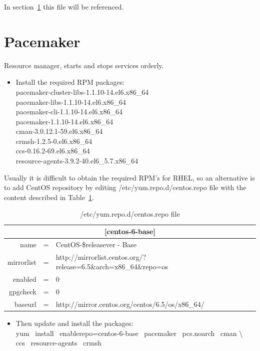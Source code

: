 \documentclass[a4paper, 12pt]{book}
\begin{document}
\noindent In section~\ref{sec:pacemaker} this file will be referenced.

\section{Pacemaker}
\label{sec:pacemaker}

\noindent Resource manager, starts and stops services orderly.

\begin{itemize}
	\item Install the required RPM packages:\\
		pacemaker-cluster-libs-1.1.10-14.el6.x86\_64\\
		pacemaker-libs-1.1.10-14.el6.x86\_64\\
		pacemaker-cli-1.1.10-14.el6.x86\_64\\
		pacemaker-1.1.10-14.el6.x86\_64\\
		cman-3.0.12.1-59.el6.x86\_64\\
		crmsh-1.2.5-0.el6.x86\_64\\
		ccs-0.16.2-69.el6.x86\_64\\
		resource-agents-3.9.2-40.el6\_5.7.x86\_64
\end{itemize}

\noindent Usually it is difficult to obtain the required RPM's for RHEL, so an alternative is to add CentOS repository by editing /etc/yum.repo.d/centos.repo file with the content described in Table~\ref{table:centosrepo}.

\FloatBarrier
\begin{table}[H]
  \centering
  \begin{tabular}{ | r c l | }
    \hline
      \multicolumn{3}{|c|}{[centos-6-base]}\\
      \hline
      name &=& CentOS-\$releasever - Base\\
      mirrorlist &=& http://mirrorlist.centos.org/?release=6.5\&arch=x86\_64\&repo=os\\
      enabled &=& 0\\
      gpgcheck &=& 0\\
      baseurl &=& http://mirror.centos.org/centos/6.5/os/x86\_64/\\
    \hline
  \end{tabular}
\caption{/etc/yum.repo.d/centos.repo file}
\label{table:centosrepo}
\end{table}

\begin{itemize}
	\item Then update and install the packages:\\
		yum \ install \ \textminus \textminus enablerepo=centos-6-base \ pacemaker \ pcs.noarch \ cman \textbackslash \\
		ccs \ resource-agents \ crmsh
\end{itemize}
\end{document}

